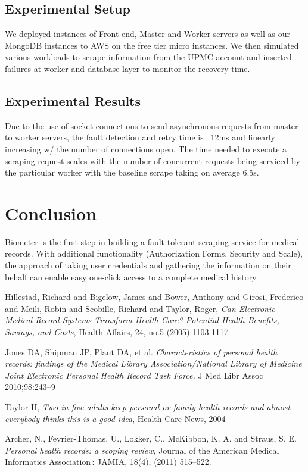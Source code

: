 \documentclass{sig-alternate-nocopyright}
\begin{document}
\subsection{Experimental Setup}
We deployed instances of Front-end, Master and Worker servers as well as our MongoDB instances to AWS on the free tier micro instances. We then simulated various workloads to scrape information from the UPMC account and inserted failures at worker and database layer to monitor the recovery time.
\subsection{Experimental Results}
Due to the use of socket connections to send asynchronous requests from master to worker servers, the fault detection and retry time is ~12ms  and linearly increasing w/ the number of connections open. The time needed to execute a scraping request scales with the number of concurrent requests being serviced by the particular worker with the baseline scrape taking on average 6.5s.
\section{Conclusion}
Biometer is the first step in building a fault tolerant scraping service for medical records. With additional functionality (Authorization Forms, Security and Scale), the approach of taking user credentials and gathering the information on their behalf can enable easy one-click access to a complete medical history.
%
\begin{thebibliography}{9}

  Hillestad, Richard and Bigelow, James and Bower, Anthony and Girosi, Frederico and Meili, Robin and Scobille, Richard and Taylor, Roger,
  \emph{Can Electronic Medical Record Systems Transform Health Care? Potential Health Benefits, Savings, and Costs},
  Health Affairs, 24, no.5 (2005):1103-1117
  
	Jones DA, Shipman JP, Plaut DA, et al.
	\emph{Characteristics of personal health records: findings of the Medical Library Association/National Library of Medicine Joint Electronic Personal Health Record Task Force.}
	 J Med Libr Assoc 2010;98:243–9
	 
	Taylor H,
	\emph{Two in five adults keep personal or family health records and almost everybody thinks this is a good idea}, 
	Health Care News,
	2004
	
	Archer, N., Fevrier-Thomas, U., Lokker, C., McKibbon, K. A. and Straus, S. E. 
	\emph{Personal health records: a scoping review},
	Journal of the American Medical Informatics Association : JAMIA,
	 18(4), (2011) 515–522. 
\end{thebibliography}
\end{document}
